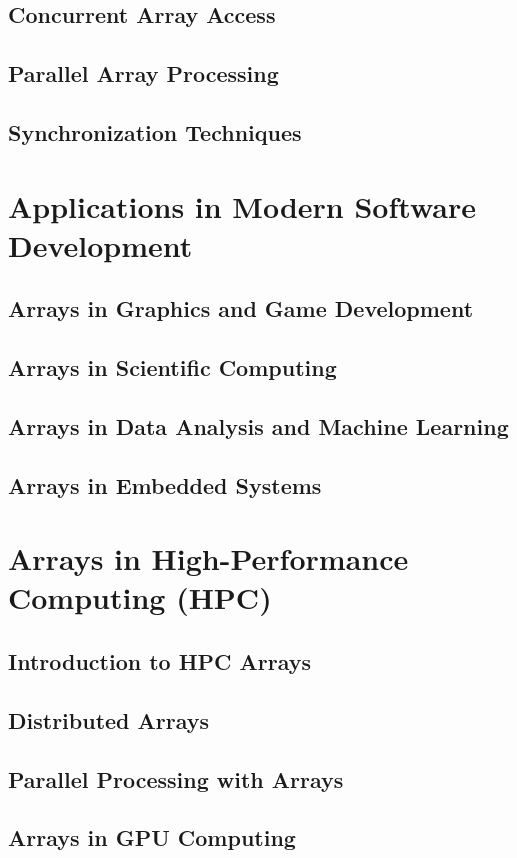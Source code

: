 \documentclass[12pt, oneside]{book}
\begin{document}
\section{Concurrent Array Access}
\section{Parallel Array Processing}
\section{Synchronization Techniques}

\chapter{Applications in Modern Software Development}
\section{Arrays in Graphics and Game Development}
\section{Arrays in Scientific Computing}
\section{Arrays in Data Analysis and Machine Learning}
\section{Arrays in Embedded Systems}

\chapter{Arrays in High-Performance Computing (HPC)}
\section{Introduction to HPC Arrays}
\section{Distributed Arrays}
\section{Parallel Processing with Arrays}
\section{Arrays in GPU Computing}
\end{document}
